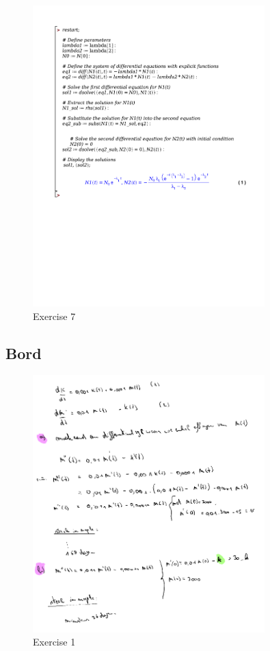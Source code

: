 \documentclass[a4paper]{report}
\begin{document}
\begin{figure}[H]
	\centering
	\includegraphics[width=0.8\textwidth]{exercises/ex_7_huis_8.pdf}
	\caption{Exercise 7}
	\label{fig:exercise_7_huis_8}
\end{figure}

\subsection{Bord}

\begin{figure}[H]
	\centering
	\includegraphics[width=0.8\textwidth]{assets/bord_8_ex_1.png}
	\caption{Exercise 1}
	\label{fig:bord_8_ex_1}
\end{figure}
\end{document}
